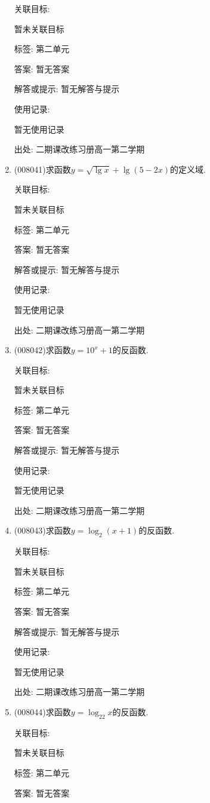 \documentclass[10pt,a4paper]{article}
\begin{document}
\begin{enumerate}[1.]
关联目标:

暂未关联目标



标签: 第二单元

答案: 暂无答案

解答或提示: 暂无解答与提示

使用记录:

暂无使用记录


出处: 二期课改练习册高一第二学期
\item { (008041)}求函数$y=\sqrt {\lg x}+\lg (5-2x)$的定义域.


关联目标:

暂未关联目标



标签: 第二单元

答案: 暂无答案

解答或提示: 暂无解答与提示

使用记录:

暂无使用记录


出处: 二期课改练习册高一第二学期
\item { (008042)}求函数$y=10^x+1$的反函数.


关联目标:

暂未关联目标



标签: 第二单元

答案: 暂无答案

解答或提示: 暂无解答与提示

使用记录:

暂无使用记录


出处: 二期课改练习册高一第二学期
\item { (008043)}求函数$y=\log _2(x+1)$的反函数.


关联目标:

暂未关联目标



标签: 第二单元

答案: 暂无答案

解答或提示: 暂无解答与提示

使用记录:

暂无使用记录


出处: 二期课改练习册高一第二学期
\item { (008044)}求函数$y=\log _22x$的反函数.


关联目标:

暂未关联目标



标签: 第二单元

答案: 暂无答案


\end{enumerate}
\end{document}

